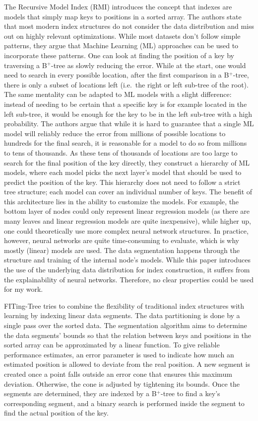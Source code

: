 The Recursive Model Index (RMI) \cite{Kraska2018} introduces the concept that indexes are models that simply map keys to positions in a sorted array. The authors state that most modern index structures do not consider the data distribution and miss out on highly relevant optimizations. While most datasets don't follow simple patterns, they argue that Machine Learning (ML) approaches can be used to incorporate these patterns. One can look at finding the position of a key by traversing a B$^+$-tree as slowly reducing the error. While at the start, one would need to search in every possible location, after the first comparison in a B$^+$-tree, there is only a subset of locations left (i.e.~the right or left sub-tree of the root). The same mentality can be adapted to ML models with a slight difference: instead of needing to be certain that a specific key is for example located in the left sub-tree, it would be enough for the key to be in the left sub-tree with a high probability. The authors argue that while it is hard to guarantee that a single ML model will reliably reduce the error from millions of possible locations to hundreds for the final search, it is reasonable for a model to do so from millions to tens of thousands. As these tens of thousands of locations are too large to search for the final position of the key directly, they construct a hierarchy of ML models, where each model picks the next layer's model that should be used to predict the position of the key. This hierarchy does not need to follow a strict tree structure; each model can cover an individual number of keys. The benefit of this architecture lies in the ability to customize the models. For example, the bottom layer of nodes could only represent linear regression models (as there are many leaves and linear regression models are quite inexpensive), while higher up, one could theoretically use more complex neural network structures. In practice, however, neural networks are quite  time-consuming to evaluate, which is why mostly (linear) models are used. The data segmentation happens through the structure and training of the internal node's models. While this paper introduces the use of the underlying data distribution for index construction, it suffers from the explainability of neural networks. Therefore, no clear properties could be used for my work.

FITing-Tree \cite{Galakatos2019} tries to combine the ﬂexibility of traditional index structures with learning by indexing linear data segments. The data partitioning is done by a single pass over the sorted data. The segmentation algorithm aims to determine the data segments' bounds so that the relation between keys and positions in the sorted array can be approximated by a linear function. To give reliable performance estimates, an error parameter is used to indicate how much an estimated position is allowed to deviate from the real position. A new segment is created once a point falls outside an error cone that ensures this maximum deviation. Otherwise, the cone is adjusted by tightening its bounds. Once the segments are determined, they are indexed by a B$^+$-tree to find a key's corresponding segment, and a binary search is performed inside the segment to find the actual position of the key.


